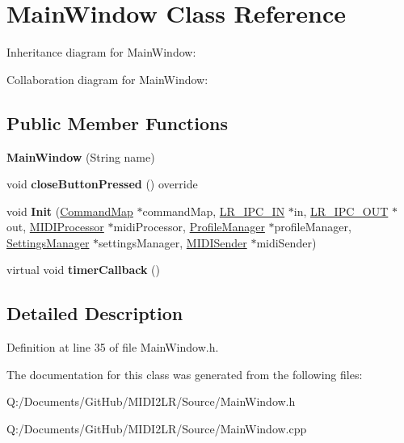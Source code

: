 \hypertarget{class_main_window}{}\section{Main\+Window Class Reference}
\label{class_main_window}


Inheritance diagram for Main\+Window\+:


Collaboration diagram for Main\+Window\+:
\subsection*{Public Member Functions}
\begin{DoxyCompactItemize}
\item 
{\bfseries Main\+Window} (String name)\hypertarget{class_main_window_a6ef7a51f3acb124271f11eecb6df7a07}{}\label{class_main_window_a6ef7a51f3acb124271f11eecb6df7a07}

\item 
void {\bfseries close\+Button\+Pressed} () override\hypertarget{class_main_window_a50d2e609ff67f40e10806605f8281bc4}{}\label{class_main_window_a50d2e609ff67f40e10806605f8281bc4}

\item 
void {\bfseries Init} (\hyperlink{class_command_map}{Command\+Map} $\ast$command\+Map, \hyperlink{class_l_r___i_p_c___i_n}{L\+R\+\_\+\+I\+P\+C\+\_\+\+IN} $\ast$in, \hyperlink{class_l_r___i_p_c___o_u_t}{L\+R\+\_\+\+I\+P\+C\+\_\+\+O\+UT} $\ast$out, \hyperlink{class_m_i_d_i_processor}{M\+I\+D\+I\+Processor} $\ast$midi\+Processor, \hyperlink{class_profile_manager}{Profile\+Manager} $\ast$profile\+Manager, \hyperlink{class_settings_manager}{Settings\+Manager} $\ast$settings\+Manager, \hyperlink{class_m_i_d_i_sender}{M\+I\+D\+I\+Sender} $\ast$midi\+Sender)\hypertarget{class_main_window_aeaffcd2208ac76f68e8b9b2c76a95e1d}{}\label{class_main_window_aeaffcd2208ac76f68e8b9b2c76a95e1d}

\item 
virtual void {\bfseries timer\+Callback} ()\hypertarget{class_main_window_adc87d108fe34a3c4ca0a021a21bd2ac0}{}\label{class_main_window_adc87d108fe34a3c4ca0a021a21bd2ac0}

\end{DoxyCompactItemize}


\subsection{Detailed Description}


Definition at line 35 of file Main\+Window.\+h.



The documentation for this class was generated from the following files\+:\begin{DoxyCompactItemize}
\item 
Q\+:/\+Documents/\+Git\+Hub/\+M\+I\+D\+I2\+L\+R/\+Source/Main\+Window.\+h\item 
Q\+:/\+Documents/\+Git\+Hub/\+M\+I\+D\+I2\+L\+R/\+Source/Main\+Window.\+cpp\end{DoxyCompactItemize}
